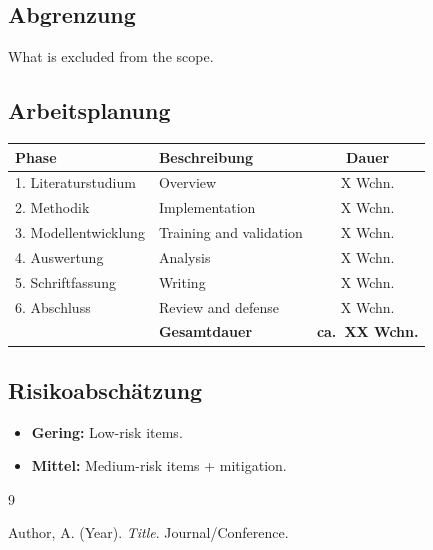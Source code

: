 \documentclass[11pt, a4paper, oneside]{article}
\begin{document}
\subsection{Abgrenzung}
What is excluded from the scope.

\subsection{Arbeitsplanung}
\begin{table}[h!]
\centering\small
\begin{tabular}{@{}llc@{}}
\toprule
\textbf{Phase} & \textbf{Beschreibung} & \textbf{Dauer} \\
\midrule
1. Literaturstudium & Overview & X Wchn. \\
2. Methodik & Implementation & X Wchn. \\
3. Modellentwicklung & Training and validation & X Wchn. \\
4. Auswertung & Analysis & X Wchn. \\
5. Schriftfassung & Writing & X Wchn. \\
6. Abschluss & Review and defense & X Wchn. \\
\midrule
& \textbf{Gesamtdauer} & \textbf{ca.\ XX Wchn.} \\
\bottomrule
\end{tabular}
\end{table}

\subsection{Risikoabschätzung}
\begin{itemize}
    \item \textbf{Gering:} Low-risk items.
    \item \textbf{Mittel:} Medium-risk items + mitigation.
\end{itemize}

\newpage

\begin{thebibliography}{9}

Author, A. (Year).
\textit{Title}.
Journal/Conference.

\end{thebibliography}
\end{document}
